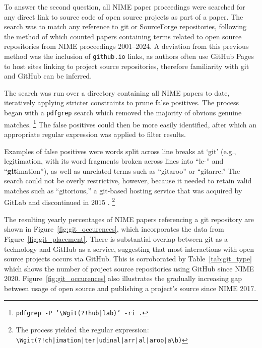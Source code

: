 To answer the second question, all NIME paper proceedings were searched for any direct link to source code of open source projects as part of a paper.
The search was to match any reference to git or SourceForge repositories, following the method of \citet{fiordelmondo_towards_2025} which counted papers containing terms related to open source repositories from NIME proceedings 2001--2024.
A deviation from this previous method was the inclusion of \texttt{github.io} links, as authors often use GitHub Pages to host sites linking to project source repositories, therefore familiarity with git and GitHub can be inferred.

The search was run over a directory containing all NIME papers to date, iteratively applying stricter constraints to prune false positives. 
The process began with a \texttt{pdfgrep} search which removed the majority of obvious genuine matches.%
\footnote{\texttt{pdfgrep -P '\textbackslash Wgit(?!hub|lab)' -ri .}}
The false positives could then be more easily identified, after which an appropriate regular expression was applied to filter results.%
 
Examples of false positives were words split across line breaks at `git' (e.g., legitimation, with its word fragments broken across lines into ``le-'' and ``\textbf{git}imation''), as well as unrelated terms such as ``gitaroo'' or ``gitarre.''
The search could not be overly restrictive, 
however, because it needed to retain valid matches such as ``gitorious,'' a git-based hosting service that was acquired by GitLab and discontinued in 2015 \cite{bjaanes_gitorious_2015}.%
\footnote{The process yielded the regular expression:\\ \texttt{\textbackslash Wgit(?!ch|imation|ter|udinal|arr|al|aroo|a\textbackslash b)}}

The resulting yearly percentages of NIME papers referencing a git repository are shown in Figure~\ref{fig:git_occurences}, which incorporates the data from Figure~\ref{fig:git_placement}.
There is substantial overlap between git as a technology and GitHub as a service, suggesting that most interactions with open source projects occurs via GitHub.
This is corroborated by Table~\ref{tab:git_type} which shows the number of project source repositories using GitHub since NIME 2020.
Figure~\ref{fig:git_occurences} also illustrates the gradually increasing gap between usage of open source and publishing a project's source since NIME 2017.


